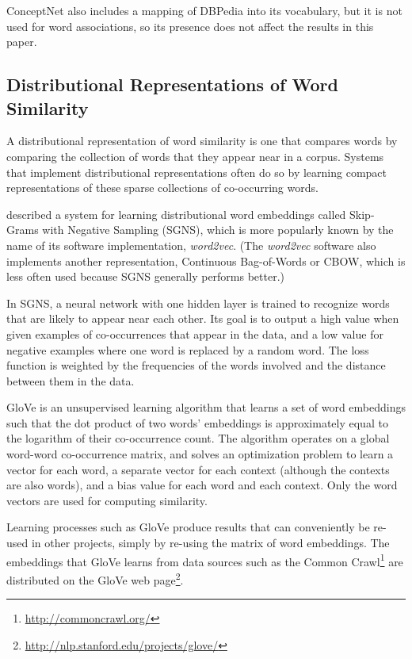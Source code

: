 \documentclass[11pt,letterpaper]{article}
\begin{document}
ConceptNet also includes a mapping of DBPedia \cite{auer2007dbpedia} into
its vocabulary, but it is not used for word associations, so its presence does
not affect the results in this paper.

\subsection{Distributional Representations of Word Similarity}

A distributional representation of word similarity is one that compares words
by comparing the collection of words that they appear near in a corpus.
Systems that implement distributional representations often do so by learning
compact representations of these sparse collections of co-occurring words.

 described a system for learning distributional
word embeddings called Skip-Grams with Negative Sampling (SGNS), which is more
popularly known by the name of its software implementation, {\em word2vec}.
(The {\em word2vec} software also implements another representation, Continuous
Bag-of-Words or CBOW, which is less often used because SGNS generally performs
better.)

In SGNS, a neural network with one hidden layer is trained to recognize words
that are likely to appear near each other. Its goal is to output a high value
when given examples of co-occurrences that appear in the data, and a low value
for negative examples where one word is replaced by a random word. The loss
function is weighted by the frequencies of the words involved and the distance
between them in the data.

GloVe \cite{pennington2014glove} is an unsupervised learning algorithm that
learns a set of word embeddings such that the dot product of two words'
embeddings is approximately equal to the logarithm of their co-occurrence count.
The algorithm operates on a global word-word co-occurrence matrix, and
solves an optimization problem to learn a vector for each word, a separate
vector for each context (although the contexts are also words), and a bias
value for each word and each context. Only the word vectors are used for
computing similarity.

Learning processes such as GloVe produce results that can conveniently be
re-used in other projects, simply by re-using the matrix of word embeddings.
The embeddings that GloVe learns from data sources such as the Common
Crawl\footnote{\url{http://commoncrawl.org/}} are
distributed on the GloVe web
page\footnote{\url{http://nlp.stanford.edu/projects/glove/}}.
\end{document}
